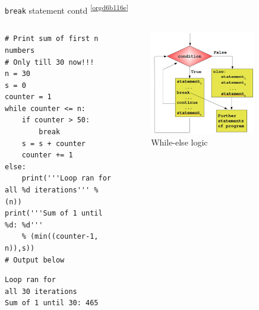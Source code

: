 \documentclass[presentation]{beamer}
\begin{document}
\begin{frame}[label={sec:org5aa4c22},fragile]{\texttt{break} statement contd \textsuperscript{\ref{orgd6b116e}}}
 \begin{columns}
\begin{column}{0.48\columnwidth}
\scriptsize
\begin{verbatim}
# Print sum of first n numbers
# Only till 30 now!!!
n = 30
s = 0
counter = 1
while counter <= n:
    if counter > 50:
        break
    s = s + counter
    counter += 1
else:
    print('''Loop ran for
all %d iterations''' % (n))
print('''Sum of 1 until %d: %d'''
    % (min((counter-1, n)),s))
# Output below
\end{verbatim}

\begin{verbatim}
Loop ran for
all 30 iterations
Sum of 1 until 30: 465
\end{verbatim}
\end{column}

\begin{column}{0.45\columnwidth}
\footnotesize
\begin{figure}[htbp]
\centering
\includegraphics[width=0.8\textwidth]{images/while_loop_with_else_break.png}
\caption{While-else logic}
\end{figure}
\end{column}
\end{columns}
\end{frame}
\end{document}
